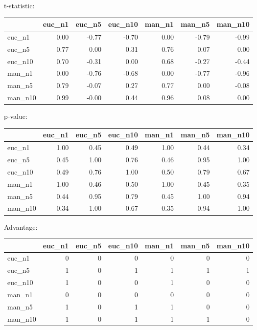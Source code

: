 t-statistic:
 \begin{tabular}{lrrrrrr}
\hline
         &   euc\_n1 &   euc\_n5 &   euc\_n10 &   man\_n1 &   man\_n5 &   man\_n10 \\
\hline
 euc\_n1  &     0.00 &    -0.77 &     -0.70 &     0.00 &    -0.79 &     -0.99 \\
 euc\_n5  &     0.77 &     0.00 &      0.31 &     0.76 &     0.07 &      0.00 \\
 euc\_n10 &     0.70 &    -0.31 &      0.00 &     0.68 &    -0.27 &     -0.44 \\
 man\_n1  &     0.00 &    -0.76 &     -0.68 &     0.00 &    -0.77 &     -0.96 \\
 man\_n5  &     0.79 &    -0.07 &      0.27 &     0.77 &     0.00 &     -0.08 \\
 man\_n10 &     0.99 &    -0.00 &      0.44 &     0.96 &     0.08 &      0.00 \\
\hline
\end{tabular} 

p-value:
 \begin{tabular}{lrrrrrr}
\hline
         &   euc\_n1 &   euc\_n5 &   euc\_n10 &   man\_n1 &   man\_n5 &   man\_n10 \\
\hline
 euc\_n1  &     1.00 &     0.45 &      0.49 &     1.00 &     0.44 &      0.34 \\
 euc\_n5  &     0.45 &     1.00 &      0.76 &     0.46 &     0.95 &      1.00 \\
 euc\_n10 &     0.49 &     0.76 &      1.00 &     0.50 &     0.79 &      0.67 \\
 man\_n1  &     1.00 &     0.46 &      0.50 &     1.00 &     0.45 &      0.35 \\
 man\_n5  &     0.44 &     0.95 &      0.79 &     0.45 &     1.00 &      0.94 \\
 man\_n10 &     0.34 &     1.00 &      0.67 &     0.35 &     0.94 &      1.00 \\
\hline
\end{tabular} 

Advantage:
 \begin{tabular}{lrrrrrr}
\hline
         &   euc\_n1 &   euc\_n5 &   euc\_n10 &   man\_n1 &   man\_n5 &   man\_n10 \\
\hline
 euc\_n1  &        0 &        0 &         0 &        0 &        0 &         0 \\
 euc\_n5  &        1 &        0 &         1 &        1 &        1 &         1 \\
 euc\_n10 &        1 &        0 &         0 &        1 &        0 &         0 \\
 man\_n1  &        0 &        0 &         0 &        0 &        0 &         0 \\
 man\_n5  &        1 &        0 &         1 &        1 &        0 &         0 \\
 man\_n10 &        1 &        0 &         1 &        1 &        1 &         0 \\
\hline
\end{tabular} 

